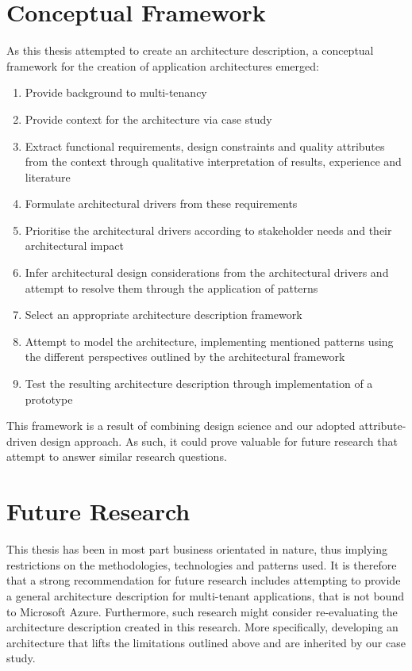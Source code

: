 \section{Conceptual Framework}
As this thesis attempted to create an architecture description, a conceptual framework for the creation of application architectures emerged:
\begin{enumerate}
\item Provide background to multi-tenancy
\item Provide context for the architecture via case study
\item Extract functional requirements, design constraints and quality attributes from the context through qualitative interpretation of results, experience and literature
\item Formulate architectural drivers from these requirements
\item Prioritise the architectural drivers according to stakeholder needs and their architectural impact
\item Infer architectural design considerations from the architectural drivers and attempt to resolve them through the application of patterns
\item Select an appropriate architecture description framework
\item Attempt to model the architecture, implementing mentioned patterns using the different perspectives outlined by the architectural framework
\item Test the resulting architecture description through implementation of a prototype
\end{enumerate}
This framework is a result of combining design science and our adopted attribute-driven design approach. As such, it could prove valuable for future research that attempt to answer similar research questions. 
\vfill

\section{Future Research}
This thesis has been in most part business orientated in nature, thus implying  restrictions on the methodologies, technologies and patterns used. It is therefore that a strong recommendation for future research includes attempting to provide a general architecture description for multi-tenant applications, that is not bound to Microsoft Azure. Furthermore, such research might consider re-evaluating the architecture description created in this research. More specifically, developing an architecture that lifts the limitations outlined above and are inherited by our case study. 

